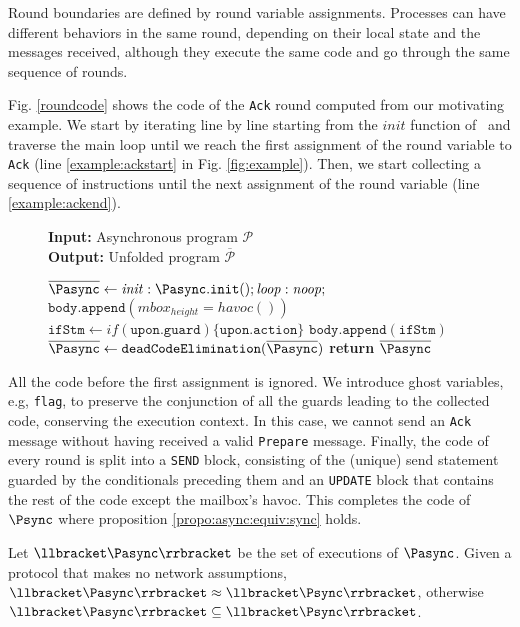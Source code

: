 Round boundaries are defined by round variable assignments. Processes can have different behaviors in the same round, depending on their local state and the messages received, although they execute the same code and go through the same sequence of rounds. 

Fig. \ref{roundcode} shows the code of the \texttt{Ack} round computed from our motivating example. We start by iterating line by line starting from the $init$ function of \Pclosed\ and traverse the main loop until we reach the first assignment of the round variable to \texttt{Ack} (line \ref{example:ackstart} in Fig. \ref{fig:example}). Then, we start collecting a sequence of instructions until the next assignment of the round variable (line \ref{example:ackend}).

\begin{figure}
\begin{algorithm}[H]
\caption{}
\label{alg:unfold}
\hspace*{\algorithmicindent} \textbf{Input:} Asynchronous program $\mathcal{P}$ \\
\hspace*{\algorithmicindent} \textbf{Output:} Unfolded program $\overline{\mathcal{P}}$
\begin{algorithmic}[1]
\State $\overline{\Pasync} \leftarrow \mathit{init:  \Pasync\mathtt{.init()} ; loop: noop ;}$ \label{alg:unfold:init}
 \label{alg:unfold:iteration}
        \State $\mathtt{body.append(\mathit{mbox_{height} = havoc()})}$
            \State $\mathtt{ifStm} \leftarrow \mathit{if(\mathtt{upon.guard})\{ \mathtt{upon.action} \}}$
            \State $\mathtt{body.append(ifStm)}$ \label{alg:unfold:addif}
        \EndFor
    \EndFor
\EndFor
\State $\overline{\Pasync} \leftarrow \mathtt{deadCodeElimination}(\overline{\Pasync})$
\State \textbf{return} $\overline{\Pasync}$
\end{algorithmic} 
\end{algorithm}
\end{figure}

All the code before the first assignment is ignored. We introduce ghost variables, e.g, \texttt{flag}, to preserve the conjunction of all the guards leading to the collected code, conserving the execution context. In this case, we cannot send an \texttt{Ack} message without having received a valid \texttt{Prepare} message.
Finally, the code of every round is split into a \texttt{SEND} block, consisting of the (unique) send statement guarded by the conditionals preceding them and an \texttt{UPDATE} block that contains the rest of the code except the mailbox’s havoc. This completes the code of $\Psync$ where proposition \ref{propo:async:equiv:sync} holds.
\begin{proposition}
Let $\llbracket \Pasync \rrbracket$ be the set of executions of $\Pasync$. Given a protocol that makes no network assumptions, $\llbracket \Pasync \rrbracket \approx \llbracket \Psync \rrbracket$, otherwise $\llbracket \Pasync \rrbracket \subseteq \llbracket \Psync \rrbracket$.
\label{propo:async:equiv:sync}
\end{proposition}


